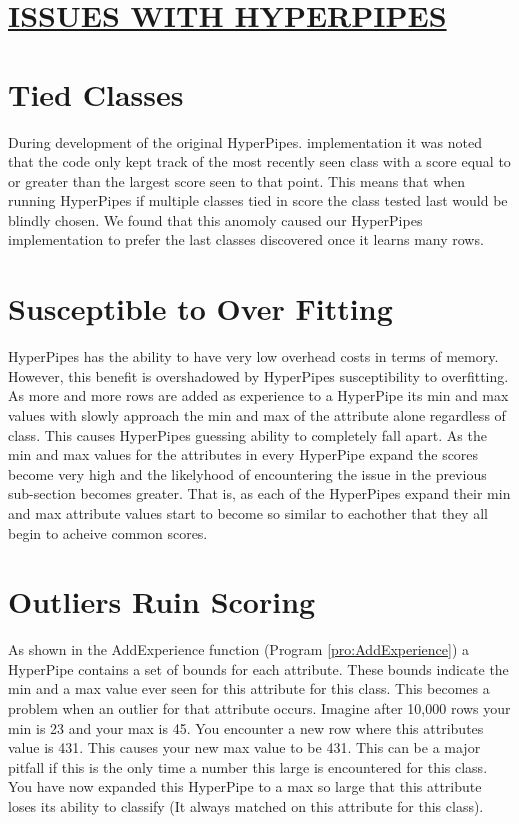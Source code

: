 \begin{kasten}
    \section*{ \hspace{0.1cm} {\color{red} \underline{ISSUES WITH HYPERPIPES}}}
    \large{
      \section{Tied Classes}
During development of the original HyperPipes. implementation it was noted 
that the code only kept track of the most recently seen class with a score 
equal to or greater than the largest score seen to that point. This means
that when running HyperPipes if multiple classes tied in score the class
tested last would be blindly chosen. We found that this anomoly caused our 
HyperPipes implementation to prefer the last classes discovered once it 
learns many rows.
\section{Susceptible to Over Fitting}
HyperPipes has the ability to have very low overhead costs in terms of 
memory. However, this benefit is overshadowed by HyperPipes susceptibility 
to overfitting. As more and more rows are added as experience to a HyperPipe 
its min and max values with slowly approach the min and max of the attribute 
alone regardless of class. This causes HyperPipes guessing ability to 
completely fall apart. As the min and max values for the attributes in every
HyperPipe expand the scores become very high and the likelyhood of 
encountering the issue in the previous sub-section becomes greater. That is, 
as each of the HyperPipes expand their min and max attribute values start to 
become so similar to eachother that they all begin to acheive common scores.
\section{Outliers Ruin Scoring}
As shown in the AddExperience function (Program \ref{pro:AddExperience}) a HyperPipe contains a set 
of bounds for each attribute. These bounds indicate the min and a max value 
ever seen for this attribute for this class. This becomes a problem when an 
outlier for that attribute occurs. Imagine after 10,000 rows your min is 23 
and your max is 45. You encounter a new row where this attributes value is 
431. This causes your new max value to be 431. This can be a major pitfall 
if this is the only time a number this large is encountered for this class. 
 You have now expanded this HyperPipe to a max so large that this attribute 
loses its ability to classify (It always matched on this attribute for this 
class).

    }
\end{kasten}

